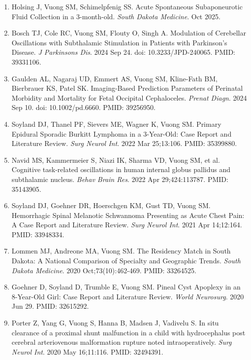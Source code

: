 \documentclass[11pt, a4paper]{article}
\begin{document}
\begin{enumerate}
  \setlength\itemindent{0.25em}
  \setlength\itemsep{0.15em}
  
  \item Holsing J, Vuong SM, Schimelpfenig SS. Acute Spontaneous Subaponeurotic Fluid Collection in a 3-month-old. \textit{South Dakota Medicine}. Oct 2025.
  
  \item Bosch TJ, Cole RC, Vuong SM, Flouty O, Singh A. Modulation of Cerebellar Oscillations with Subthalamic Stimulation in Patients with Parkinson's Disease. \textit{J Parkinsons Dis}. 2024 Sep 24. doi: 10.3233/JPD-240065. PMID: 39331106.
  
  \item Gaulden AL, Nagaraj UD, Emmert AS, Vuong SM, Kline-Fath BM, Bierbrauer KS, Patel SK. Imaging-Based Prediction Parameters of Perinatal Morbidity and Mortality for Fetal Occipital Cephaloceles. \textit{Prenat Diagn}. 2024 Sep 10. doi: 10.1002/pd.6660. PMID: 39256950.
  
  \item Soyland DJ, Thanel PF, Sievers ME, Wagner K, Vuong SM. Primary Epidural Sporadic Burkitt Lymphoma in a 3-Year-Old: Case Report and Literature Review. \textit{Surg Neurol Int}. 2022 Mar 25;13:106. PMID: 35399880.
  
  \item Navid MS, Kammermeier S, Niazi IK, Sharma VD, Vuong SM, et al. Cognitive task-related oscillations in human internal globus pallidus and subthalamic nucleus. \textit{Behav Brain Res}. 2022 Apr 29;424:113787. PMID: 35143905.
  
  \item Soyland DJ, Goehner DR, Hoerschgen KM, Gust TD, Vuong SM. Hemorrhagic Spinal Melanotic Schwannoma Presenting as Acute Chest Pain: A Case Report and Literature Review. \textit{Surg Neurol Int}. 2021 Apr 14;12:164. PMID: 33948334.
  
  \item Lommen MJ, Andreone MA, Vuong SM. The Residency Match in South Dakota: A National Comparison of Specialty and Geographic Trends. \textit{South Dakota Medicine}. 2020 Oct;73(10):462-469. PMID: 33264525.
  
  \item Goehner D, Soyland D, Trumble E, Vuong SM. Pineal Cyst Apoplexy in an 8-Year-Old Girl: Case Report and Literature Review. \textit{World Neurosurg}. 2020 Jun 29. PMID: 32615292.
  
  \item Porter Z, Yang G, Vuong S, Hanna B, Madsen J, Vadivelu S. In situ clearance of a proximal shunt malfunction in a child with hydrocephalus post cerebral arteriovenous malformation rupture noted intraoperatively. \textit{Surg Neurol Int}. 2020 May 16;11:116. PMID: 32494391.
  

\end{enumerate}
\end{document}
